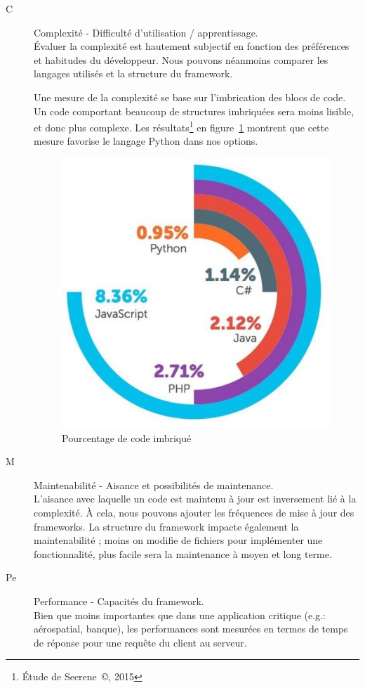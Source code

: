 \documentclass{EPL-master-thesis-covers-FR}
\begin{document}
					\begin{description}
						\item[C] Complexité - Difficulté d'utilisation / apprentissage. \hfill \\
							\'Evaluer la complexité est hautement subjectif en fonction des préférences et habitudes du développeur. Nous pouvons néanmoins comparer les langages utilisés et la structure du framework.

							Une mesure de la complexité se base sur l'imbrication des blocs de code. Un code comportant beaucoup de structures imbriquées sera moins lisible, et donc plus complexe. Les résultats\footnote{\'Etude de Seerene~\copyright, 2015} en figure~\ref{fig:complexity} montrent que cette mesure favorise le langage Python dans nos options.

							\begin{figure}
								\centering
								\includegraphics[width=.6\textwidth]{images/complexity}
								\caption{Pourcentage de code imbriqué}
								\label{fig:complexity}
							\end{figure}

					\item[M] Maintenabilité - Aisance et possibilités de maintenance. \hfill \\
							L'aisance avec laquelle un code est maintenu à jour est inversement lié à la complexité. À cela, nous pouvons ajouter les fréquences de mise à jour des frameworks. La structure du framework impacte également la maintenabilité ; moins on modifie de fichiers pour implémenter une fonctionnalité, plus facile sera la maintenance à moyen et long terme.

					\item[Pe] Performance - Capacités du framework. \hfill \\
							Bien que moins importantes que dans une application critique (e.g.: aérospatial, banque), les performances sont mesurées en termes de temps de réponse pour une requête du client au serveur.


\end{description}
\end{document}
